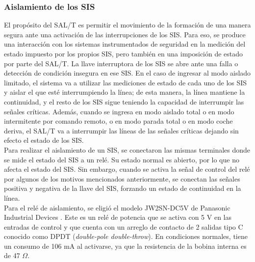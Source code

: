 \subsubsection{Aislamiento de los SIS}


El propósito del SAL/T es permitir el movimiento de la formación de una manera segura ante una activación de las interrupciones de los SIS. Para eso, se produce una interacción con los sistemas instrumentados de seguridad en la medición del estado impuesto por los propios SIS, pero también en una imposición de estado por parte del SAL/T. La llave interruptora de los SIS se abre ante una falla o detección de condición insegura en ese SIS. En el caso de ingresar al modo aislado limitado, el sistema va a utilizar las mediciones de estado de cada uno de los SIS y aislar el que esté interrumpiendo la línea; de esta manera, la línea mantiene la continuidad, y el resto de los SIS sigue teniendo la capacidad de interrumpir las señales críticas. Además, cuando se ingresa en modo aislado total o en modo intermitente por comando remoto, o en modo parada total o en modo coche deriva, el SAL/T va a interrumpir las líneas de las señales críticas dejando sin efecto el estado de los SIS. \\    

Para realizar el aislamiento de un SIS, se conectaron las mismas terminales donde se mide el estado del SIS a un relé. Su estado normal es abierto, por lo que no afecta el estado del SIS. Sin embargo, cuando se activa la señal de control del relé por algunos de los motivos mencionados anteriormente, se conectan las señales positiva y negativa de la llave del SIS, forzando un estado de continuidad en la línea. \\ 

Para el relé de aislamiento, se eligió el modelo JW2SN-DC5V de Panasonic Industrial Devices \cite{JW2SN-DC5V}. Este es un relé de potencia que se activa con 5 V en las entradas de control y que cuenta con un arreglo de contacto de 2 salidas tipo C conocido como DPDT (\textit{double-pole double-throw}). En condiciones normales, tiene un consumo de 106 mA al activarse, ya que la resistencia de la bobina interna es de 47 $\Omega$. \\

